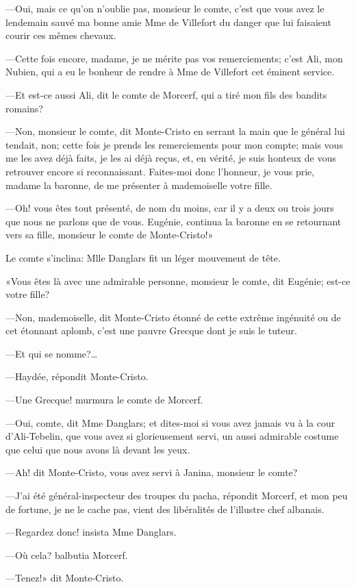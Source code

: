 —Oui, mais ce qu'on n'oublie pas, monsieur le comte, c'est que vous avez le lendemain sauvé ma bonne amie Mme de Villefort du danger que lui faisaient courir ces mêmes chevaux. 

—Cette fois encore, madame, je ne mérite pas vos remerciements; c'est Ali, mon Nubien, qui a eu le bonheur de rendre à Mme de Villefort cet éminent service. 

—Et est-ce aussi Ali, dit le comte de Morcerf, qui a tiré mon fils des bandits romains? 

—Non, monsieur le comte, dit Monte-Cristo en serrant la main que le général lui tendait, non; cette fois je prends les remerciements pour mon compte; mais vous me les avez déjà faits, je les ai déjà reçus, et, en vérité, je suis honteux de vous retrouver encore si reconnaissant. Faites-moi donc l'honneur, je vous prie, madame la baronne, de me présenter à mademoiselle votre fille. 

—Oh! vous êtes tout présenté, de nom du moins, car il y a deux ou trois jours que nous ne parlons que de vous. Eugénie, continua la baronne en se retournant vers sa fille, monsieur le comte de Monte-Cristo!» 

Le comte s'inclina: Mlle Danglars fit un léger mouvement de tête. 

«Vous êtes là avec une admirable personne, monsieur le comte, dit Eugénie; est-ce votre fille? 

—Non, mademoiselle, dit Monte-Cristo étonné de cette extrême ingénuité ou de cet étonnant aplomb, c'est une pauvre Grecque dont je suis le tuteur.  

—Et qui se nomme?\dots 

—Haydée, répondit Monte-Cristo. 

—Une Grecque! murmura le comte de Morcerf. 

—Oui, comte, dit Mme Danglars; et dites-moi si vous avez jamais vu à la cour d'Ali-Tebelin, que vous avez si glorieusement servi, un aussi admirable costume que celui que nous avons là devant les yeux. 

—Ah! dit Monte-Cristo, vous avez servi à Janina, monsieur le comte? 

—J'ai été général-inspecteur des troupes du pacha, répondit Morcerf, et mon peu de fortune, je ne le cache pas, vient des libéralités de l'illustre chef albanais. 

—Regardez donc! insista Mme Danglars. 

—Où cela? balbutia Morcerf. 

—Tenez!» dit Monte-Cristo. 

